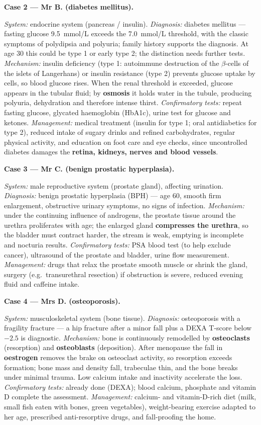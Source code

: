 \documentclass[11pt]{article}
\newcommand{\cle}[1]{{\popxbold\color{popdark}#1}}
\begin{document}
\textbf{Case 2 — Mr B. (diabetes mellitus).}\par
\emph{System:} endocrine system (pancreas / insulin). \emph{Diagnosis:} \cle{diabetes mellitus} — fasting glucose \SI{9.5}{mmol/L} exceeds the \SI{7.0}{mmol/L} threshold, with the classic symptoms of polydipsia and polyuria; family history supports the diagnosis. At age 30 this could be type 1 or early type 2; the distinction needs further tests. \emph{Mechanism:} insulin deficiency (type 1: autoimmune destruction of the $\beta$-cells of the islets of Langerhans) or insulin resistance (type 2) prevents glucose uptake by cells, so blood glucose rises. When the renal threshold is exceeded, glucose appears in the tubular fluid; by \textbf{osmosis} it holds water in the tubule, producing polyuria, dehydration and therefore intense thirst. \emph{Confirmatory tests:} repeat fasting glucose, glycated haemoglobin (HbA1c), urine test for glucose and ketones. \emph{Management:} medical treatment (insulin for type 1; oral antidiabetics for type 2), reduced intake of sugary drinks and refined carbohydrates, regular physical activity, and education on foot care and eye checks, since uncontrolled diabetes damages the \textbf{retina, kidneys, nerves and blood vessels}.

\textbf{Case 3 — Mr C. (benign prostatic hyperplasia).}\par
\emph{System:} male reproductive system (prostate gland), affecting urination. \emph{Diagnosis:} \cle{benign prostatic hyperplasia} (BPH) — age 60, smooth firm enlargement, obstructive urinary symptoms, no signs of infection. \emph{Mechanism:} under the continuing influence of androgens, the prostate tissue around the urethra proliferates with age; the enlarged gland \textbf{compresses the urethra}, so the bladder must contract harder, the stream is weak, emptying is incomplete and nocturia results. \emph{Confirmatory tests:} PSA blood test (to help exclude cancer), ultrasound of the prostate and bladder, urine flow measurement. \emph{Management:} drugs that relax the prostate smooth muscle or shrink the gland, surgery (e.g.\ transurethral resection) if obstruction is severe, reduced evening fluid and caffeine intake.

\textbf{Case 4 — Mrs D. (osteoporosis).}\par
\emph{System:} musculoskeletal system (bone tissue). \emph{Diagnosis:} \cle{osteoporosis} with a fragility fracture — a hip fracture after a minor fall plus a DEXA T-score below $-2.5$ is diagnostic. \emph{Mechanism:} bone is continuously remodelled by \textbf{osteoclasts} (resorption) and \textbf{osteoblasts} (deposition). After menopause the fall in \textbf{oestrogen} removes the brake on osteoclast activity, so resorption exceeds formation; bone mass and density fall, trabeculae thin, and the bone breaks under minimal trauma. Low calcium intake and inactivity accelerate the loss. \emph{Confirmatory tests:} already done (DEXA); blood calcium, phosphate and vitamin D complete the assessment. \emph{Management:} calcium- and vitamin-D-rich diet (milk, small fish eaten with bones, green vegetables), weight-bearing exercise adapted to her age, prescribed anti-resorptive drugs, and fall-proofing the home.
\end{document}
